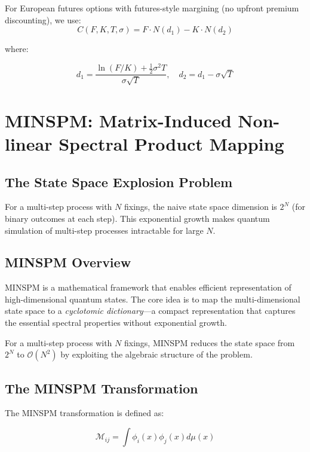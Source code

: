 \documentclass[12pt]{article}
\begin{document}
For European futures options with futures-style margining (no upfront premium discounting), we use:
\begin{equation}
C(F, K, T, \sigma) = F \cdot N(d_1) - K \cdot N(d_2)
\end{equation}

where:

\begin{equation}
d_1 = \frac{\ln(F/K) + \frac{1}{2}\sigma^2 T}{\sigma\sqrt{T}}, \quad d_2 = d_1 - \sigma\sqrt{T}
\end{equation}

\section{MINSPM: Matrix-Induced Non-linear Spectral Product Mapping}

\subsection{The State Space Explosion Problem}

For a multi-step process with $N$ fixings, the naive state space dimension is $2^N$ (for binary outcomes at each step). This exponential growth makes quantum simulation of multi-step processes intractable for large $N$.

\subsection{MINSPM Overview}

MINSPM is a mathematical framework that enables efficient representation of high-dimensional quantum states. The core idea is to map the multi-dimensional state space to a \textit{cyclotomic dictionary}—a compact representation that captures the essential spectral properties without exponential growth.

For a multi-step process with $N$ fixings, MINSPM reduces the state space from $2^N$ to $\mathcal{O}(N^2)$ by exploiting the algebraic structure of the problem.

\subsection{The MINSPM Transformation}

The MINSPM transformation is defined as:

\begin{equation}
\mathcal{M}_{ij} = \int \phi_i(x) \phi_j(x) d\mu(x)
\end{equation}
\end{document}
